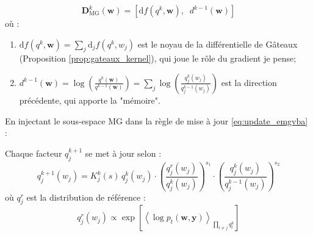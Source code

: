 \documentclass[12pt]{article}
\newcommand{\w}{\boldsymbol{w}}
\newcommand{\y}{\boldsymbol{y}}
\begin{document}
\begin{definitionbox}
\label{def:mg_subspace}
\begin{equation}
    \boldsymbol{D}^k_{\mathrm{MG}}(\w) = \left[\mathrm{d}f(q^k, \w),\;\; d^{k-1}(\w)\right]
\end{equation}
où 
:
\begin{enumerate}[label=(\roman*)]
    \item $\mathrm{d}f(q^k, \w) = \sum_j \mathrm{d}_j f(q^k, w_j)$ est le noyau de la différentielle de Gâteaux (Proposition 
\ref{prop:gateaux_kernel}), qui joue le rôle du gradient je pense;
    \item $d^{k-1}(\w) = \log\!\left(\frac{q^k(\w)}{q^{k-1}(\w)}\right) = \sum_j \log\!\left(\frac{q_j^k(w_j)}{q_j^{k-1}(w_j)}\right)$ est la direction précédente, qui apporte la "mémoire".
\end{enumerate}
\end{definitionbox}


En injectant le sous-espace MG dans la règle de mise à jour \eqref{eq:update_emgvba} 
:

\begin{propositionbox}
\label{prop:update_explicit}
Chaque facteur $q_j^{k+1}$ se met à jour selon 
:
\begin{equation}
    q_j^{k+1}(w_j) = K_j^k(s)\, q_j^k(w_j) \cdot \left(\frac{q_j^r(w_j)}{q_j^k(w_j)}\right)^{s_1} \cdot \left(\frac{q_j^k(w_j)}{q_j^{k-1}(w_j)}\right)^{s_2}
    \label{eq:update_component}
\end{equation}
où $q_j^r$ est la distribution de référence :
\begin{equation}
    q_j^r(w_j) \propto \exp\!\left[\left\langle \log p_t(\w, \y) \right\rangle_{\prod_{l \neq j} q_l^k}\right]
    \label{eq:qr}
\end{equation}
\end{propositionbox}
\end{document}
